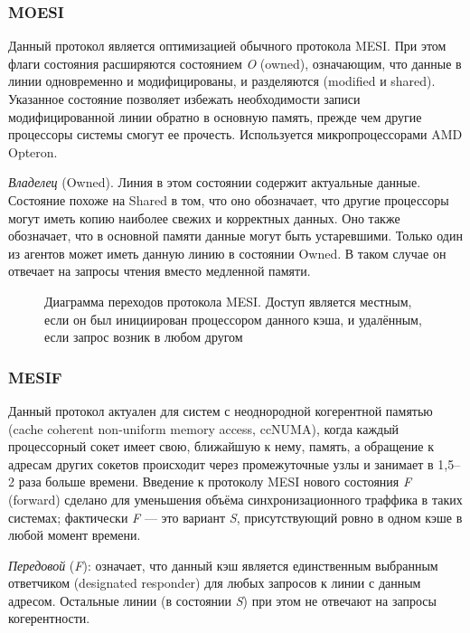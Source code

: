 \subsubsection{MOESI}

Данный протокол является оптимизацией  обычного протокола MESI. При этом флаги состояния расширяются состоянием \textit{O} (\abbr owned), означающим, что данные в линии одновременно и модифицированы, и разделяются (modified и shared). Указанное состояние позволяет избежать необходимости записи модифицированной линии обратно в основную память, прежде чем другие процессоры системы смогут ее прочесть. Используется микропроцессорами AMD Opteron.
\begin{itemize*}
\item    \textit{Владелец} (Owned). Линия в этом состоянии содержит актуальные данные. Состояние похоже на Shared в том, что оно обозначает, что другие процессоры могут иметь копию наиболее свежих и корректных данных. Оно также обозначает, что в основной памяти данные могут быть устаревшими. Только один из агентов может иметь данную линию в состоянии Owned. В таком случае он отвечает на запросы чтения вместо медленной памяти.
\end{itemize*}

\begin{figure}[htb]
    \centering
    \caption[Диаграмма переходов протокола MESI]{Диаграмма переходов протокола MESI. Доступ является местным, если он был инициирован процессором данного кэша, и удалённым, если запрос возник в любом другом}
    \label{fig:mesi}
\end{figure}

\subsubsection{MESIF}

Данный протокол актуален для систем с неоднородной когерентной памятью (\abbr cache coherent non-uniform memory access, ccNUMA), когда каждый процессорный сокет имеет свою, ближайшую к нему, память, а обращение к адресам других сокетов происходит через промежуточные узлы и занимает в 1,5--2 раза больше времени. Введение к протоколу MESI нового состояния \textit{F} (\abbr forward) сделано для уменьшения объёма синхронизационного траффика в таких системах; фактически \textit{F} --- это вариант \textit{S}, присутствующий ровно в одном кэше в любой момент времени.
\begin{itemize*}
\item \textit{Передовой} (\textit{F}): означает, что данный кэш является единственным выбранным ответчиком (\abbr designated responder) для любых запросов к линии с данным адресом. Остальные линии (в состоянии \textit{S}) при этом не отвечают на запросы когерентности. 
\end{itemize*}

